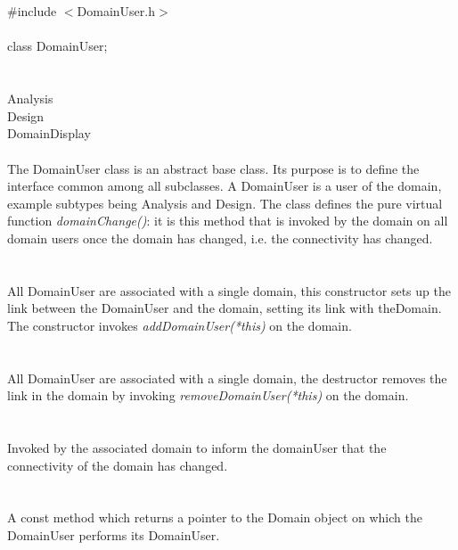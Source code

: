 
 \\

   \\
\indent \#include $<$DomainUser.h$>$  \\

  \\
\indent class DomainUser;  \\

 \\
 \\
\indent\indent Analysis \\
\indent\indent Design \\
\indent\indent DomainDisplay \\

 \\ 
\indent The DomainUser class is an abstract base class. Its purpose is
to define the interface common among all subclasses.  A DomainUser is
a user of the domain, example subtypes being Analysis and Design. The
class defines the pure virtual function {\em domainChange()}: it is
this method that is invoked by the domain on all domain users once the
domain has changed, i.e. the connectivity has changed. \\

\\ \\ 
All DomainUser are associated with a single domain, this constructor
sets up the link between the DomainUser and the domain, setting its link
with theDomain. The constructor invokes {\em addDomainUser(*this)} on
the domain. \\  

 \\
\\ 
All DomainUser are associated with a single domain, the destructor
removes the link in the domain by invoking {\em removeDomainUser(*this)}
on the domain. \\

\\
 \\
Invoked by the associated domain to inform the domainUser that the
connectivity of the domain has changed. \\


  \\
 \\
A const method which returns a pointer to the Domain object on which
the DomainUser performs its DomainUser.





